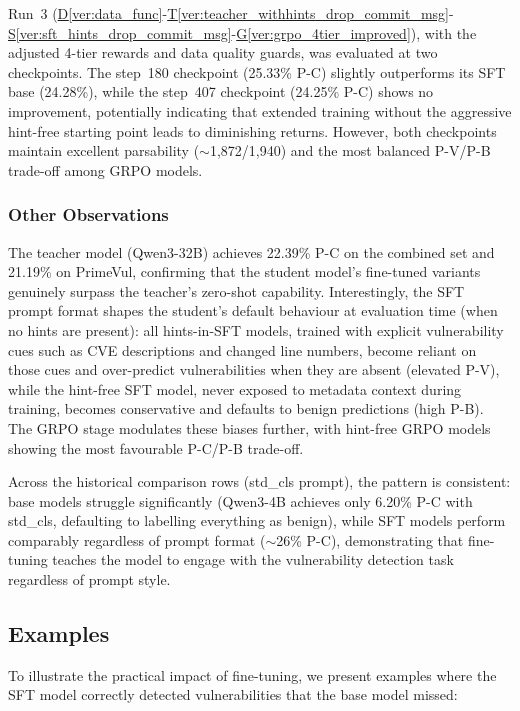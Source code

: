 \documentclass[12pt,a4paper]{article}
\newcommand{\vcode}[4]{\hyperref[#1]{D\ref*{#1}}-\hyperref[#2]{T\ref*{#2}}-\hyperref[#3]{S\ref*{#3}}-\hyperref[#4]{G\ref*{#4}}}
\begin{document}
Run~3 (\vcode{ver:data_func}{ver:teacher_withhints_drop_commit_msg}{ver:sft_hints_drop_commit_msg}{ver:grpo_4tier_improved}), with the adjusted 4-tier rewards and data quality guards, was evaluated at two checkpoints. The step~180 checkpoint (25.33\% P-C) slightly outperforms its SFT base (24.28\%), while the step~407 checkpoint (24.25\% P-C) shows no improvement, potentially indicating that extended training without the aggressive hint-free starting point leads to diminishing returns. However, both checkpoints maintain excellent parsability ($\sim$1,872/1,940) and the most balanced P-V/P-B trade-off among GRPO models.

\subsubsection{Other Observations}

The teacher model (Qwen3-32B) achieves 22.39\% P-C on the combined set and 21.19\% on PrimeVul, confirming that the student model's fine-tuned variants genuinely surpass the teacher's zero-shot capability. Interestingly, the SFT prompt format shapes the student's default behaviour at evaluation time (when no hints are present): all hints-in-SFT models, trained with explicit vulnerability cues such as CVE descriptions and changed line numbers, become reliant on those cues and over-predict vulnerabilities when they are absent (elevated P-V), while the hint-free SFT model, never exposed to metadata context during training, becomes conservative and defaults to benign predictions (high P-B). The GRPO stage modulates these biases further, with hint-free GRPO models showing the most favourable P-C/P-B trade-off.

Across the historical comparison rows (std\_cls prompt), the pattern is consistent: base models struggle significantly (Qwen3-4B achieves only 6.20\% P-C with std\_cls, defaulting to labelling everything as benign), while SFT models perform comparably regardless of prompt format ($\sim$26\% P-C), demonstrating that fine-tuning teaches the model to engage with the vulnerability detection task regardless of prompt style.

\subsection{Examples}

To illustrate the practical impact of fine-tuning, we present examples where the SFT model correctly detected vulnerabilities that the base model missed:
\end{document}
